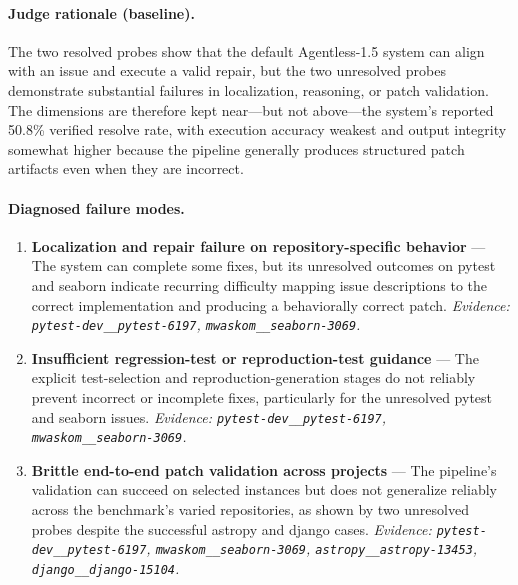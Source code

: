 \paragraph{Judge rationale (baseline).}
The two resolved probes show that the default Agentless-1.5 system can align with an issue and execute a valid repair, but the two unresolved probes demonstrate substantial failures in localization, reasoning, or patch validation. The dimensions are therefore kept near—but not above—the system's reported 50.8\% verified resolve rate, with execution accuracy weakest and output integrity somewhat higher because the pipeline generally produces structured patch artifacts even when they are incorrect.
\paragraph{Diagnosed failure modes.}\begin{enumerate}\itemsep1pt
\item \textbf{Localization and repair failure on repository-specific behavior} --- The system can complete some fixes, but its unresolved outcomes on pytest and seaborn indicate recurring difficulty mapping issue descriptions to the correct implementation and producing a behaviorally correct patch. \emph{Evidence: \texttt{pytest-dev\_\_pytest-6197}, \texttt{mwaskom\_\_seaborn-3069}.}
\item \textbf{Insufficient regression-test or reproduction-test guidance} --- The explicit test-selection and reproduction-generation stages do not reliably prevent incorrect or incomplete fixes, particularly for the unresolved pytest and seaborn issues. \emph{Evidence: \texttt{pytest-dev\_\_pytest-6197}, \texttt{mwaskom\_\_seaborn-3069}.}
\item \textbf{Brittle end-to-end patch validation across projects} --- The pipeline's validation can succeed on selected instances but does not generalize reliably across the benchmark's varied repositories, as shown by two unresolved probes despite the successful astropy and django cases. \emph{Evidence: \texttt{pytest-dev\_\_pytest-6197}, \texttt{mwaskom\_\_seaborn-3069}, \texttt{astropy\_\_astropy-13453}, \texttt{django\_\_django-15104}.}
\end{enumerate}
